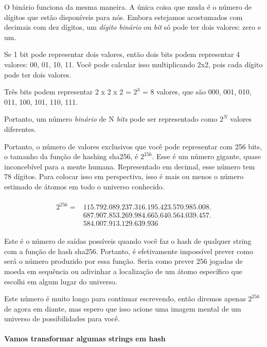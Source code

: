 O binário funciona da mesma maneira. A única coisa que muda é o número de dígitos que estão disponíveis para nós. Embora estejamos acostumados com decimais com dez dígitos, um \textit{dígito binário} ou \textit{bit} só pode ter dois valores: zero e um.

Se 1 bit pode representar dois valores, então dois bits podem representar 4 valores: 00, 01, 10, 11. Você pode calcular isso multiplicando 2x2, pois cada dígito pode ter dois valores.

Três bits podem representar 2 x 2 x 2 = \(2^3\) = 8 valores, que são 000, 001, 010, 011, 100, 101, 110, 111.

Portanto, um número \textit{binário} de N \textit{bits} pode ser representado como \(2^N\) valores diferentes.

Portanto, o número de valores exclusivos que você pode representar com 256 bits, o tamanho da função de hashing sha256, é \(2^{256}\). Esse é um número gigante, quase inconcebível para a mente humana. Representado em decimal, esse número tem 78 dígitos. Para colocar isso em perspectiva, isso é mais ou menos o número estimado de átomos em todo o universo conhecido.


\begin{multline}
\begin{aligned}
2^{256} = & 115.792.089.237.316.195.423.570.985.008.\\
& 687.907.853.269.984.665.640.564.039.457.\\
& 584.007.913.129.639.936
\end{aligned}
\end{multline}


Este é o número de saídas possíveis quando você faz o hash de qualquer string com a função de hash sha256. Portanto, é efetivamente impossível prever como será o número produzido por essa função. Seria como prever 256 jogadas de moeda em sequência ou adivinhar a localização de um átomo específico que escolhi em algum lugar do universo.

Este número é muito longo para continuar escrevendo, então diremos apenas \(2^{256}\) de agora em diante, mas espero que isso acione uma imagem mental de um universo de possibilidades para você.

\paragraph{Vamos transformar algumas strings em hash}
\paragraph{}

